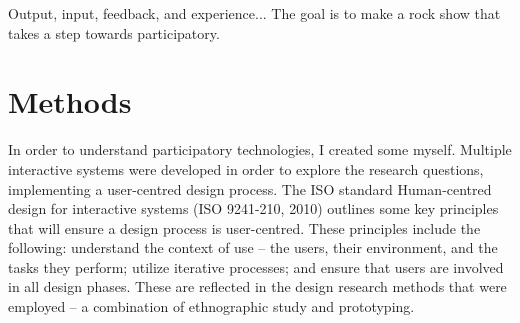 Output, input, feedback, and experience...
The goal is to make a rock show that takes a step towards participatory.


\section{Methods}

In order to understand participatory technologies, I created some myself. Multiple interactive systems were developed in order to explore the research questions, implementing a user-centred design process. The ISO standard Human-centred design for interactive systems (ISO 9241-210, 2010) outlines some key principles that will ensure a design process is user-centred. These principles include the following: understand the context of use -- the users, their environment, and the tasks they perform; utilize iterative processes; and ensure that users are involved in all design phases. These are reflected in the design research methods that were employed -- a combination of ethnographic study and prototyping. 

